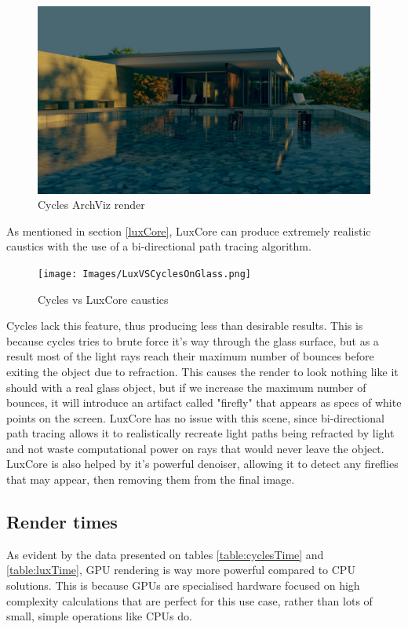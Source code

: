 \documentclass[conference]{IEEEtran}
\begin{document}
    
    \begin{figure}[htbp]
        \centering
        \includegraphics[scale=0.2]{Images/ARCHcycles.jpg}
        
        \caption{Cycles ArchViz render}
        \label{fig:luxARCHvsc}
    \end{figure}
    
As mentioned in section \ref{luxCore}, LuxCore can produce extremely realistic caustics with the use of a bi-directional path tracing algorithm. 

\begin{figure}[h]
        \centering
        \texttt{[image: Images/LuxVSCyclesOnGlass.png]}
        
        \caption{Cycles vs LuxCore caustics}
        \label{fig:causticsCompare}
    \end{figure}
    
Cycles lack this feature, thus producing less than desirable results. This is because cycles tries to brute force it's way through the glass surface, but as a result most of the light rays reach their maximum number of bounces before exiting the object due to refraction. This causes the render to look nothing like it should with a real glass object, but if we increase the maximum number of bounces, it will introduce an artifact called "firefly" that appears as specs of white points on the screen. LuxCore has no issue with this scene, since bi-directional path tracing allows it to realistically recreate light paths being refracted by light and not waste computational power on rays that would never leave the object. LuxCore is also helped by it's powerful denoiser, allowing it to detect any fireflies that may appear, then removing them from the final image. 

\hfill
\subsection{Render times}
As evident by the data presented on tables \ref{table:cyclesTime} and \ref{table:luxTime}, GPU rendering is way more powerful compared to CPU solutions. This is because GPUs are specialised hardware focused on high complexity calculations that are perfect for this use case, rather than lots of small, simple operations like CPUs do.
\end{document}
